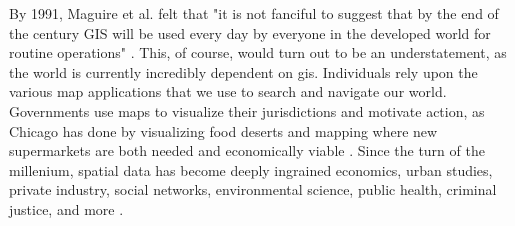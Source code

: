 \documentclass[notitlepage]{article}
\begin{document}

By 1991, Maguire et al. felt that "it is not fanciful to suggest that by the end of the century GIS will be used every day by everyone in the developed world for routine operations" \cite{maguireGeographicalInformationSystems1991}. This, of course, would turn out to be an understatement, as the world is currently incredibly dependent on \ac{gis}. Individuals rely upon the various map applications that we use to search and navigate our world. Governments use maps to visualize their jurisdictions and motivate action, as Chicago has done by visualizing food deserts and mapping where new supermarkets are both needed and economically viable \cite{goldsmithResponsiveCityEngaging2014}. Since the turn of the millenium, spatial data has become deeply ingrained economics, urban studies, private industry, social networks, environmental science, public health, criminal justice, and more \cite{goodchildSpatiallyIntegratedSocial2000}.
\end{document}
